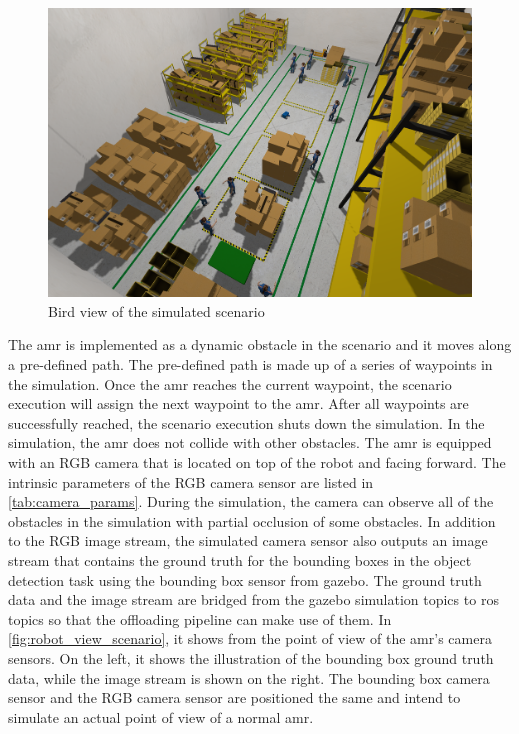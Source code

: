 \begin{figure}
    \centering
    \includegraphics[width=\linewidth]{figures/sim/bird_view.png}
    \caption{Bird view of the simulated scenario}
    \label{fig:bird_view_scenario}
\end{figure}

The \gls{amr} is implemented as a dynamic obstacle in the scenario and it moves along a pre-defined path. The pre-defined path is made up of a series of waypoints in the simulation. Once the \gls{amr} reaches the current waypoint, the scenario execution will assign the next waypoint to the \gls{amr}. After all waypoints are successfully reached, the scenario execution shuts down the simulation. In the simulation, the \gls{amr} does not collide with other obstacles. The \gls{amr} is equipped with an RGB camera that is located on top of the robot and facing forward. The intrinsic parameters of the RGB camera sensor are listed in \cref{tab:camera_params}. During the simulation, the camera can observe all of the obstacles in the simulation with partial occlusion of some obstacles. In addition to the RGB image stream, the simulated camera sensor also outputs an image stream that contains the ground truth for the bounding boxes in the object detection task using the bounding box sensor from \gls{gazebo}. The ground truth data and the image stream are bridged from the \gls{gazebo} simulation topics to \gls{ros} topics so that the offloading pipeline can make use of them. In \cref{fig:robot_view_scenario}, it shows from the point of view of the \gls{amr}'s camera sensors. On the left, it shows the illustration of the bounding box ground truth data, while the image stream is shown on the right. The bounding box camera sensor and the RGB camera sensor are positioned the same and intend to simulate an actual point of view of a normal \gls{amr}.

